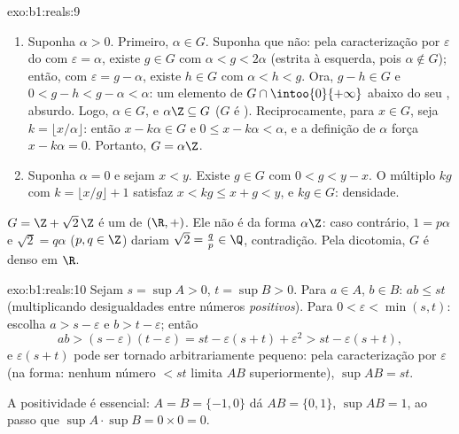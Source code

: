 \begin{solution}{exo:b1:reals:9}
\begin{enumerate}
  \item Suponha $\alpha > 0$. Primeiro, $\alpha \in G$. Suponha que não: pela
        caracterização por $\varepsilon$ do  com
        $\varepsilon = \alpha$, existe $g \in G$ com $\alpha < g <
        2\alpha$ (estrita à esquerda, pois $\alpha \notin G$); então,
        com $\varepsilon = g - \alpha$, existe $h \in G$ com
        $\alpha < h < g$. Ora, $g - h \in G$ e $0 < g - h < g -
        \alpha < \alpha$: um elemento de $G \cap \intoo{0}{+\infty}$
        abaixo do seu , absurdo. Logo, $\alpha \in G$, e $\alpha\Z
        \subseteq G$ ($G$ é ). Reciprocamente, para $x \in G$, seja
        $k = \lfloor x/\alpha \rfloor$: então $x - k\alpha \in G$ e
        $0 \leq x - k\alpha < \alpha$, e a definição de $\alpha$
        força $x - k\alpha = 0$. Portanto, $G = \alpha\Z$.
  \item Suponha $\alpha = 0$ e sejam $x < y$. Existe $g \in G$
        com $0 < g < y - x$. O múltiplo $kg$ com $k = \lfloor x/g
        \rfloor + 1$ satisfaz $x < kg \leq x + g < y$, e $kg \in
        G$: densidade.
\end{enumerate}
$G = \Z + \sqrt 2\,\Z$ é um  de $(\R, +)$. Ele não é da
forma $\alpha\Z$: caso contrário, $1 = p\alpha$ e $\sqrt 2 = q\alpha$
($p, q \in \Z$) dariam $\sqrt 2 = \frac qp \in \Q$,
contradição. Pela dicotomia, $G$ é denso em $\R$.
\end{solution}

\begin{solution}{exo:b1:reals:10}
Sejam $s = \sup A > 0$, $t = \sup B > 0$. Para $a \in A$, $b \in B$: $ab
\leq st$ (multiplicando desigualdades entre números \emph{positivos}).
Para $0 < \varepsilon < \min(s, t)$: escolha $a > s - \varepsilon$ e
$b > t - \varepsilon$; então
\[
ab > (s - \varepsilon)(t - \varepsilon)
= st - \varepsilon(s + t) + \varepsilon^2
> st - \varepsilon (s + t),
\]
e $\varepsilon(s+t)$ pode ser tornado arbitrariamente pequeno: pela
caracterização por $\varepsilon$ (na forma: nenhum número $< st$ limita
$AB$ superiormente), $\sup AB = st$.

A positividade é essencial: $A = B = \{-1, 0\}$ dá $AB = \{0, 1\}$,
$\sup AB = 1$, ao passo que $\sup A \cdot \sup B = 0 \times 0 = 0$.
\end{solution}

